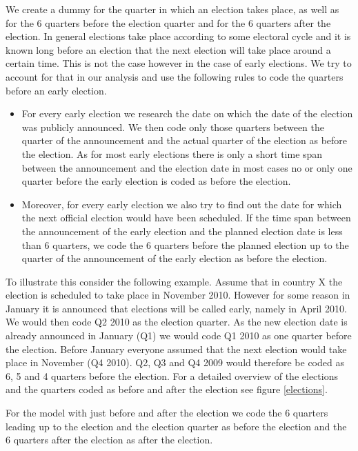 \documentclass[11pt,a4paper]{scrartcl}
\begin{document}
We create a dummy for the quarter in which an election takes place, as well as for the 6 quarters before the election quarter and for the 6 quarters after the election. In general elections take place according to some electoral cycle and it is known long before an election that the next election will take place around a certain time. This is not the case however in the case of early elections. We try to account for that in our analysis and use the following rules to code the quarters before an early election. 
\begin{itemize}
	\item For every early election we research the date on which the date of the election was publicly announced. We then code only those quarters between the quarter of the announcement and the actual quarter of the election as before the election. As for most early elections there is only a short time span between the announcement and the election date in most cases no or only one quarter before the early election is coded as before the election. 
	\item Moreover, for every early election we also try to find out the date for which the next official election would have been scheduled. If the time span between the announcement of the early election and the planned election date is less than 6 quarters, we code the 6 quarters before the planned election  up to the quarter of the announcement of the early election as before the election. 
\end{itemize} 
To illustrate this consider the following example. Assume that in country X the election is scheduled to take place in November 2010. However for some reason in January it is announced that elections will be called early, namely in April 2010. We would then code Q2 2010 as the election quarter. As the new election date is already announced in January (Q1) we would code Q1 2010 as one quarter before the election. Before January everyone assumed that the next election would take place in November (Q4 2010). Q2, Q3 and Q4 2009 would therefore be coded as 6, 5 and 4 quarters before the election. For a detailed overview of the elections and the quarters coded as before and after the election see figure \ref{elections}.

For the model with just before and after the election we code the 6 quarters leading up to the election and the election quarter as before the election and the 6 quarters after the election as after the election. 
\end{document}
